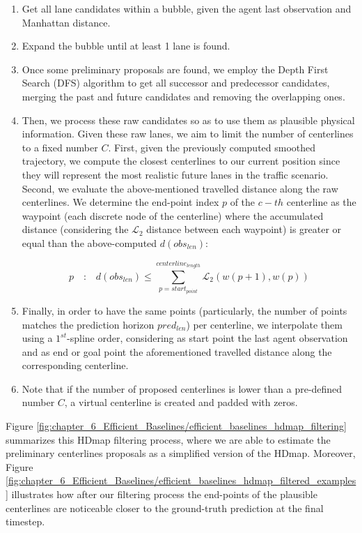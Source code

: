 \begin{enumerate}
	\item Get all lane candidates within a bubble, given the agent last observation and Manhattan distance.
	
	\item Expand the bubble until at least 1 lane is found.
	
	\item Once some preliminary proposals are found, we employ the Depth First Search (DFS) algorithm to get all successor and predecessor candidates, merging the past and future candidates and removing the overlapping ones.
	
	\item Then, we process these raw candidates so as to use them as plausible physical information. Given these raw lanes, we aim to limit the number of centerlines to a fixed number $C$. First, given the previously computed smoothed trajectory, we compute the closest centerlines to our current position since they will represent the most realistic future lanes in the traffic scenario. Second, we evaluate the above-mentioned travelled distance along the raw centerlines. We determine the end-point index $p$ of the $c-th$ centerline  as the waypoint (each discrete node of the centerline) where the accumulated distance (considering the $\mathcal{L}_2$ distance between each waypoint) is greater or equal than the above-computed $d(obs_{len})$:
	
	\begin{equation}
		p \quad \textbf{:} \quad d(obs_{len}) \leq \sum_{p=start_{point}}^{centerline_{length}} \mathcal{L}_2(w(p+1),w(p))
	\end{equation}
	
	\item Finally, in order to have the same points (particularly, the number of points matches the prediction horizon $pred_{len}$) per centerline, we interpolate them using a $1^{st}$-spline order, considering as start point the last agent observation and as end or goal point the aforementioned travelled distance along the corresponding centerline.
	
	\item Note that if the number of proposed centerlines is lower than a pre-defined number $C$, a virtual centerline is created and padded with zeros.
\end{enumerate}

Figure \ref{fig:chapter_6_Efficient_Baselines/efficient_baselines_hdmap_filtering} summarizes this \ac{HDmap} filtering process, where we are able to estimate the preliminary centerlines proposals as a simplified version of the \ac{HDmap}. Moreover, Figure \ref{fig:chapter_6_Efficient_Baselines/efficient_baselines_hdmap_filtered_examples} illustrates how after our filtering process the end-points of the plausible centerlines are noticeable closer to the ground-truth prediction at the final timestep. 

